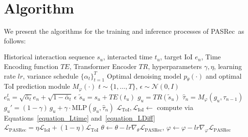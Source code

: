 \documentclass[sigconf,nonacm]{acmart}
\newcommand{\modelname}{PASRec}
\begin{document}
\section{Algorithm}
\label{app:alg}
We present the algorithms for the training and inference processes of \modelname\ as follows:
\begin{algorithm}[hbp]
\caption{Training Algorithm of \modelname}
\label{alg:tagdiff_train}
\begin{algorithmic}[1]
\Require Historical interaction sequence $s_u$, interacted time $t_u$, target IoI $e_n$, Time Encoding function $TE$, Transformer Encoder $TR$, hyperparameters $\gamma,\eta$, learning rate $lr$, variance schedule $\{\alpha_t\}_{t=1}^T$
\Ensure Optimal denoising model $p_\theta(\cdot)$ and optimal ToI prediction module $M_\varphi(\cdot)$
\Repeat
    \State $t \sim \{1, \dots, T\}$, $\epsilon \sim \mathcal{N}(0, I)$ 
    \State $e_n^t = \sqrt{\bar{\alpha}_t} e_n + \sqrt{1 - \bar{\alpha}_t} \, \epsilon$ 
    \State $\tilde{s}_u = s_u + TE(t_u)$ 
    \State $g_u = TR(\tilde{s}_u)$ 
    \State $\hat\tau_{n} = M_\varphi(g_u, \tau_{n-1})$ 
    \State $g_u' = (1 - \gamma)\,g_u + \gamma \cdot \mathrm{MLP}(g_u, \hat\tau_{n})$ 
    \State $\mathcal{L}_{\text{ToI}}, \mathcal{L}_{\text{IoI}} \gets$ compute via Equations~\eqref{equation_Ltime} and~\eqref{equation_LDiff}
    \State $\mathcal{L}_{\text{\modelname}} = \eta \mathcal{L}_{\text{IoI}} + (1 - \eta)\mathcal{L}_{\text{ToI}}$
    \State $\theta \gets \theta - lr \nabla_\theta \mathcal{L}_{\text{\modelname}}$, \quad 
       $\varphi \gets \varphi - lr \nabla_\varphi \mathcal{L}_{\text{\modelname}}$
\end{algorithmic}
\end{algorithm}
\end{document}

